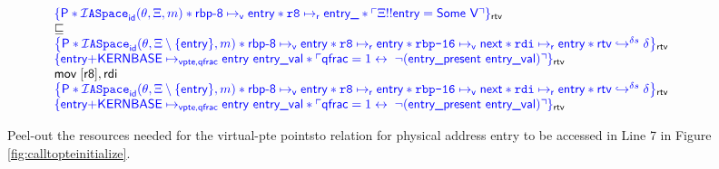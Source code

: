  \begin{figure*}
   \footnotesize
   \[
 \begin{array}{l}
   {\color{blue}\left\{\textsf{P} \ast \mathcal{I}\texttt{ASpace}_{\textsf{id}}(\theta,\Xi,m) \ast \textsf{rbp-8} \mapsto_{\textsf{v}} \textsf{entry} \ast \texttt{r8}  \mapsto_{\textsf{r}} \textsf{entry} \textsf{\_} \ast \ulcorner \Xi !! \textsf{entry} = \textsf{Some V} \urcorner  \right\}}_{\textsf{rtv}}  \\
\sqsubseteq \\
   {\color{blue}\left\{\textsf{P} \ast \mathcal{I}\texttt{ASpace}_{\textsf{id}}(\theta,\Xi\setminus \{ \mathsf{entry} \},m)  \ast \textsf{rbp-8} \mapsto_{\textsf{v}} \textsf{entry} \ast \texttt{r8}  \mapsto_{\textsf{r}} \textsf{entry}  \ast  \texttt{rbp-16} \mapsto_{\textsf{v}} \textsf{next} \ast \texttt{rdi}  \mapsto_{\textsf{r}} \textsf{entry} \ast \textsf{rtv}\hookrightarrow^{\delta{}s}\delta  \right\}}_{\textsf{rtv}} \\
{\color{blue}\left\{ \textsf{entry+KERNBASE} \mapsto_{\textsf{vpte,qfrac}} \textsf{entry entry\_val} \ast \ulcorner  \textsf{qfrac} = 1 \leftrightarrow \; \lnot(\textsf{entry\_present entry\_val})\urcorner\right\}}_{\textsf{rtv}} \\
\mathsf{mov} \;   [ \mathsf{r8} ],\mathsf{rdi}\\
 {\color{blue}\left\{\textsf{P} \ast \mathcal{I}\texttt{ASpace}_{\textsf{id}}(\theta,\Xi\setminus \{ \mathsf{entry} \},m)  \ast \textsf{rbp-8} \mapsto_{\textsf{v}} \textsf{entry} \ast \texttt{r8}  \mapsto_{\textsf{r}} \textsf{entry}  \ast  \texttt{rbp-16} \mapsto_{\textsf{v}} \textsf{next} \ast \texttt{rdi}  \mapsto_{\textsf{r}} \textsf{entry} \ast \textsf{rtv}\hookrightarrow^{\delta{}s}\delta  \right\}}_{\textsf{rtv}} \\
{\color{blue}\left\{ \textsf{entry+KERNBASE} \mapsto_{\textsf{vpte,qfrac}} \textsf{entry entry\_val} \ast \ulcorner  \textsf{qfrac} = 1 \leftrightarrow \; \lnot(\textsf{entry\_present entry\_val})\urcorner\right\}}_{\textsf{rtv}} \\
 \end{array}
 \]
 \vspace{-1em}
\caption{Peel-out the resources needed for the virtual-pte pointsto relation for physical address \textsf{entry} to be accessed in Line 7 in Figure \ref{fig:calltopteinitialize}. }
  \label{fig:lookingupidpampping}
 \end{figure*}

